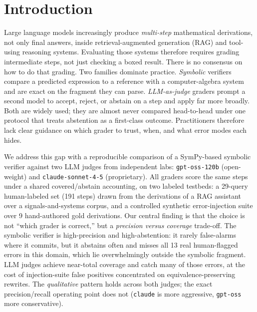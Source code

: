 \section{Introduction}
\label{sec:intro}

Large language models increasingly produce \emph{multi-step} mathematical
derivations, not only final answers, inside retrieval-augmented generation
(RAG) and tool-using reasoning systems. Evaluating those systems therefore
requires grading intermediate steps, not just checking a boxed result. There is
no consensus on how to do that grading. Two families dominate practice.
\emph{Symbolic} verifiers compare a predicted expression to a reference with a
computer-algebra system and are exact on the fragment they can parse.
\emph{LLM-as-judge} graders prompt a second model to accept, reject, or abstain
on a step and apply far more broadly. Both are widely used; they are almost never
compared head-to-head under one protocol that treats abstention as a first-class
outcome. Practitioners therefore lack clear guidance on which grader to trust,
when, and what error modes each hides.

We address this gap with a reproducible comparison of a SymPy-based symbolic
verifier against two LLM judges from independent labs:
\texttt{gpt-oss-120b} (open-weight) and \texttt{claude-sonnet-4-5} (proprietary).
All graders score the same steps under a shared covered/abstain accounting, on
two labeled testbeds: a 29-query human-labeled set (191 steps) drawn from the
derivations of a RAG assistant over a signals-and-systems corpus, and a
controlled synthetic error-injection suite over 9 hand-authored gold
derivations. Our central finding
is that the choice is not ``which grader is
correct,'' but a \emph{precision versus coverage} trade-off. The symbolic
verifier is high-precision and high-abstention: it rarely false-alarms where it
commits, but it abstains often and misses all 13 real human-flagged errors in
this domain, which lie overwhelmingly outside the symbolic fragment. LLM
judges achieve near-total coverage and catch many of those errors, at the cost
of injection-suite false positives concentrated on equivalence-preserving
rewrites. The \emph{qualitative} pattern holds across both
judges; the exact precision/recall operating point does not
(\texttt{claude} is more aggressive, \texttt{gpt-oss} more conservative).

